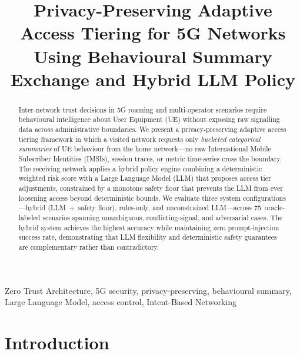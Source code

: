 \documentclass[conference]{IEEEtran}
\begin{document}
\title{Privacy-Preserving Adaptive Access Tiering for 5G Networks Using Behavioural Summary Exchange and Hybrid LLM Policy}

\author{
}

\maketitle

\begin{abstract}
Inter-network trust decisions in 5G roaming and multi-operator scenarios require behavioural intelligence about User Equipment (UE) without exposing raw signalling data across administrative boundaries. We present a privacy-preserving adaptive access tiering framework in which a visited network requests only \emph{bucketed categorical summaries} of UE behaviour from the home network---no raw International Mobile Subscriber Identities (IMSIs), session traces, or metric time-series cross the boundary. The receiving network applies a hybrid policy engine combining a deterministic weighted risk score with a Large Language Model (LLM) that proposes access tier adjustments, constrained by a monotone safety floor that prevents the LLM from ever loosening access beyond deterministic bounds. We evaluate three system configurations---hybrid (LLM~+~safety floor), rules-only, and unconstrained LLM---across 75~oracle-labeled scenarios spanning unambiguous, conflicting-signal, and adversarial cases. The hybrid system achieves the highest accuracy while maintaining zero prompt-injection success rate, demonstrating that LLM flexibility and deterministic safety guarantees are complementary rather than contradictory.
\end{abstract}

\begin{IEEEkeywords}
Zero Trust Architecture, 5G security, privacy-preserving, behavioural summary, Large Language Model, access control, Intent-Based Networking
\end{IEEEkeywords}

\section{Introduction}
\label{sec:intro}
\end{document}
